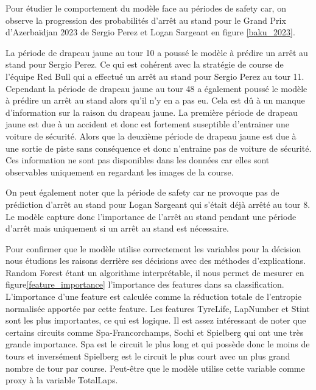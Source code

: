 Pour étudier le comportement du modèle face au périodes de safety car, on observe la progression des probabilités d'arrêt au stand pour le Grand Prix d'Azerbaïdjan 2023 de Sergio Perez et Logan Sargeant en figure \ref{baku_2023}.


La période de drapeau jaune au tour 10 a poussé le modèle à prédire un arrêt au stand pour Sergio Perez.
Ce qui est cohérent avec la stratégie de course de l'équipe Red Bull qui a effectué un arrêt au stand pour Sergio Perez au tour 11.
Cependant la période de drapeau jaune au tour 48 a également poussé le modèle à prédire un arrêt au stand alors qu'il n'y en a pas eu.
Cela est dû à un manque d'information sur la raison du drapeau jaune. La première période de drapeau jaune est due à un accident et donc est fortement suseptible d'entrainer une voiture de sécurité.
Alors que la deuxième période de drapeau jaune est due à une sortie de piste sans conséquence et donc n'entraine pas de voiture de sécurité.
Ces information ne sont pas disponibles dans les données car elles sont observables uniquement en regardant les images de la course.

On peut également noter que la période de safety car ne provoque pas de prédiction d'arrêt au stand pour Logan Sargeant qui s'était déjà arrêté au tour 8.
Le modèle capture donc l'importance de l'arrêt au stand pendant une période d'arrêt mais uniquement si un arrêt au stand est nécessaire.

Pour confirmer que le modèle utilise correctement les variables pour la décision nous étudions les raisons derrière ses décisions avec des méthodes d'explications.
Random Forest étant un algorithme interprétable, il nous permet de mesurer en figure\ref{feature_importance} l'importance des features dans sa classification.
L'importance d'une feature est calculée comme la réduction totale de l'entropie normalisée apportée par cette feature.
Les features TyreLife, LapNumber et Stint sont les plus importantes, ce qui est logique.
Il est assez intéressant de noter que certains circuits comme Spa-Francorchamps, Sochi et Spielberg qui ont une très grande importance.
Spa est le circuit le plus long et qui possède donc le moins de tours et inversément Spielberg est le circuit le plus court avec un plus grand nombre de tour par course.
Peut-être que le modèle utilise cette variable comme proxy à la variable TotalLaps.

